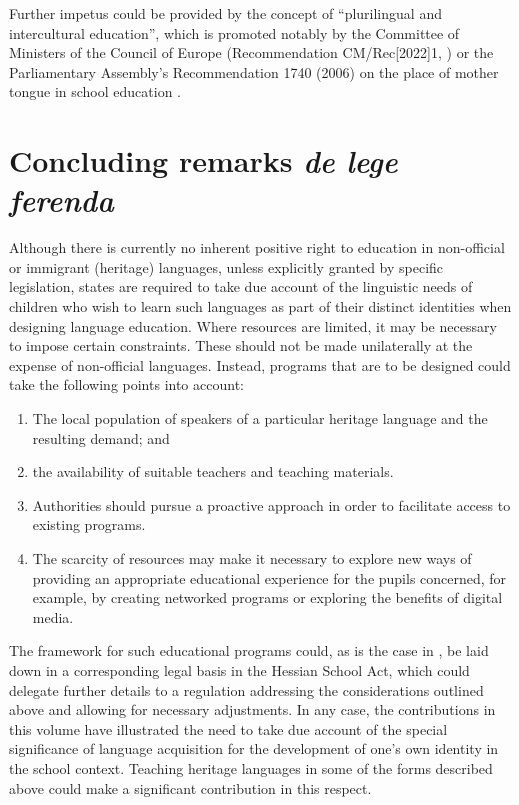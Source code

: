 \documentclass[output=paper,colorlinks,citecolor=brown]{langscibook}
\begin{document}
\largerpage
Further impetus could be provided by the concept of ``plurilingual and intercultural education'', which is promoted notably by the Committee of Ministers of the Council of Europe (Recommendation CM/Rec[2022]1, \citealt{cm2022}) or the Parliamentary Assembly's Recommendation 1740 (2006) on the place of mother tongue in school education \citep{pa2006}.

\section{Concluding remarks \textit{de lege ferenda}}\label{CH3.ss.4}

Although there is currently no inherent positive right to education in non-of\-fi\-cial or immigrant (heritage) languages, unless explicitly granted by specific legislation, states are required to take due account of the linguistic needs of children who wish to learn such languages as part of their distinct identities when designing language education. Where resources are limited, it may be necessary to impose certain constraints. These should not be made unilaterally at the expense of non-official languages. Instead, programs that are to be designed could take the following points into account:

\begin{enumerate}
    \item The local population of speakers of a particular heritage language and the resulting demand; and
    \item the availability of suitable teachers and teaching materials.
    \item Authorities should pursue a proactive approach in order to facilitate access to existing programs.
    \item The scarcity of resources may make it necessary to explore new ways of providing an appropriate educational experience for the pupils concerned, for example, by creating networked programs or exploring the benefits of digital media.
\end{enumerate}
   
The framework for such educational programs could, as is the case in , be laid down in a corresponding legal basis in the Hessian School Act, which could delegate further details to a regulation addressing the considerations outlined above and allowing for necessary adjustments. In any case, the contributions in this volume have illustrated the need to take due account of the special significance of language acquisition for the development of one's own identity in the school context. Teaching heritage languages in some of the forms described above could make a significant contribution in this respect.
\end{document}
